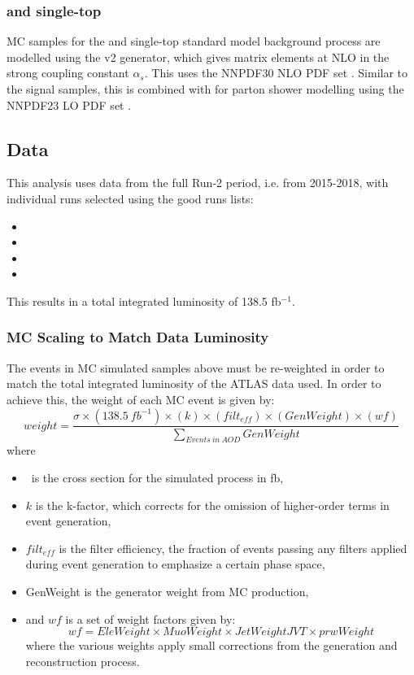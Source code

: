 \subsubsection{\ttbar and single-top}
MC samples for the \ttbar and single-top standard model background process are modelled using the \powhegbox v2 \cite{Powheg} generator, which gives matrix elements at NLO in the strong coupling constant $\alpha_s$. This uses the NNPDF30 NLO PDF set \cite{PDF30}. Similar to the signal samples, this is combined with  \cite{Pythia} for parton shower modelling using the NNPDF23 LO PDF set \cite{PDF23}.

\subsection{Data}
This analysis uses data from the full Run-2 period, i.e. from 2015-2018, with individual runs selected using the good runs lists:
{ \scriptsize
\begin{itemize}
	\item \GRLa
	\item \GRLb
	\item \GRLc
	\item \GRLd
\end{itemize}
}
This results in a total integrated luminosity of 138.5 fb$^{-1}$.

\subsubsection{MC Scaling to Match Data Luminosity}
\label{subsubsection:mc_scaling}
The events in MC simulated samples above must be re-weighted in order to match the total integrated luminosity of the ATLAS data used. In order to achieve this, the weight of each MC event is given by:
\begin{equation}
weight  = \frac{ \sigma \times (138.5~fb^{-1}) \times (k) \times (filt_{eff}) \times (GenWeight) \times (wf)}{\sum_{Events~in~AOD} GenWeight }
\end{equation}
where
\begin{itemize}
\item \sigma~is the cross section for the simulated process in fb,
\item $k$ is the k-factor, which corrects for the omission of higher-order terms in event generation,
\item $filt_{eff}$ is the filter efficiency, the fraction of events passing any filters applied during event generation to emphasize a certain phase space,
\item GenWeight is the generator weight from MC production,
\item and $wf$ is a set of weight factors given by:
\begin{equation}
wf = EleWeight \times MuoWeight \times JetWeightJVT \times prwWeight
\end{equation}
where the various weights apply small corrections from the generation and reconstruction process.
\end{itemize}


